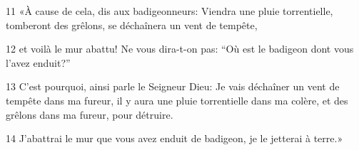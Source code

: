 
11 «À cause de cela, dis aux badigeonneurs: Viendra une pluie torrentielle, tomberont des grêlons, se déchaînera un vent de tempête,

12 et voilà le mur abattu! Ne vous dira-t-on pas: “Où est le badigeon dont vous l’avez enduit?”

13 C’est pourquoi, ainsi parle le Seigneur Dieu: Je vais déchaîner un vent de tempête dans ma fureur, il y aura une pluie torrentielle dans ma colère, et des grêlons dans ma fureur, pour détruire.

14 J’abattrai le mur que vous avez enduit de badigeon, je le jetterai à terre.»